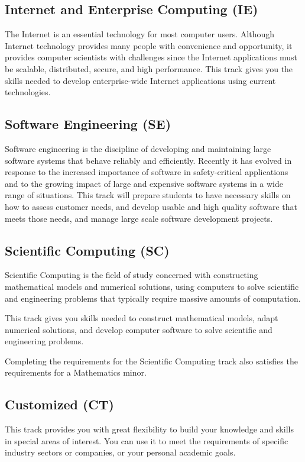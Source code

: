\documentclass{book}
\newcommand{\ietrackname}{Internet and Enterprise Computing (IE)}
\newcommand{\setrackname}{Software Engineering (SE)}
\newcommand{\sctrackname}{Scientific Computing (SC)}
\newcommand{\cttrackname}{Customized (CT)}
\begin{document}
\subsection{\ietrackname}
\ietrackindex
The Internet is an essential technology for most computer users. Although Internet technology provides many people with convenience and opportunity, it provides computer scientists with challenges since the Internet applications must be scalable, distributed, secure, and high performance. This track gives you the skills needed to develop enterprise-wide Internet applications using current technologies.

\subsection{\setrackname}
\setrackindex
Software engineering is the discipline of developing and maintaining large software systems that behave reliably and efficiently. Recently it has evolved in response to the increased importance of software in safety-critical applications and to the growing impact of large and expensive software systems in a wide range of situations. This track will prepare students to have necessary skills on how to assess customer needs, and develop usable and high quality software that meets those needs, and manage large scale software development projects.

\subsection{\sctrackname}
\sctrackindex

Scientific Computing is the field of study concerned with constructing mathematical models and numerical solutions, using computers to solve scientific and engineering problems that typically require massive amounts of computation.

This track gives you skills needed to construct mathematical models, adapt numerical solutions, and develop computer software to solve scientific and engineering problems.

Completing the requirements for the Scientific Computing track also satisfies the requirements for a Mathematics minor.

\subsection{\cttrackname}
\cttrackindex

This track provides you with great flexibility to build your knowledge and skills in special areas of interest. You can use it to meet the requirements of specific industry sectors or companies, or your personal academic goals.
\end{document}
